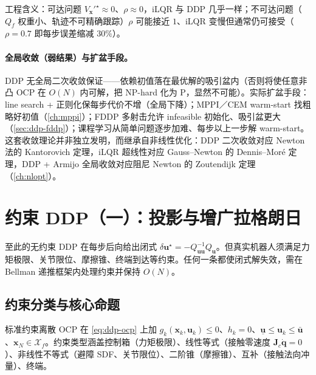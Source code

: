 工程含义：可达问题 $V_{\mathbf{x}}'^{\star}\approx0$、$\rho\approx0$，iLQR 与 DDP 几乎一样；不可达问题（$Q_f$ 权重小、轨迹不可精确跟踪）$\rho$ 可能接近 $1$、iLQR 变慢但通常仍可接受（$\rho=0.7$ 即每步误差缩减 $30\%$）。

\paragraph{全局收敛（弱结果）与扩盆手段。}\;
DDP 无全局二次收敛保证——依赖初值落在最优解的吸引盆内（否则将使任意非凸 OCP 在 $O(N)$ 内可解，把 NP-hard 化为 P，显然不可能）。实际扩盆手段：line search + 正则化保每步代价不增（全局下降）；MPPI／CEM warm-start 找粗略好初值（\cref{ch:mppi}）；FDDP 多射击允许 infeasible 初始化、吸引盆更大（\cref{sec:ddp-fddp}）；课程学习从简单问题逐步加难、每步以上一步解 warm-start。这套收敛理论并非独立发明，而继承自非线性优化：DDP 二次收敛对应 Newton 法的 Kantorovich 定理，iLQR 超线性对应 Gauss--Newton 的 Dennis--Moré 定理，DDP + Armijo 全局收敛对应阻尼 Newton 的 Zoutendijk 定理（\cref{ch:nlopt}）。

\section{约束 DDP（一）：投影与增广拉格朗日}
\label{sec:ddp-constr-proj}

至此的无约束 DDP 在每步后向给出闭式 $\delta\mathbf{u}^\star=-Q_{\mathbf{uu}}^{-1}Q_{\mathbf{u}}$。但真实机器人须满足力矩极限、关节限位、摩擦锥、终端到达等约束。任何一条都使闭式解失效，需在 Bellman 递推框架内处理约束并保持 $O(N)$。

\subsection{约束分类与核心命题}
\label{sec:ddp-constr-class}

标准约束离散 OCP 在 \cref{eq:ddp-ocp} 上加 $g_k(\mathbf{x}_k,\mathbf{u}_k)\le0$、$h_k=0$、$\underline{\mathbf{u}}\le\mathbf{u}_k\le\bar{\mathbf{u}}$、$\mathbf{x}_N\in\mathcal{X}_f$。约束类型涵盖控制箱（力矩极限）、线性等式（接触零速度 $\mathbf{J}_c\dot{\mathbf{q}}=0$）、非线性不等式（避障 SDF、关节限位）、二阶锥（摩擦锥）、互补（接触法向冲量）、终端。

